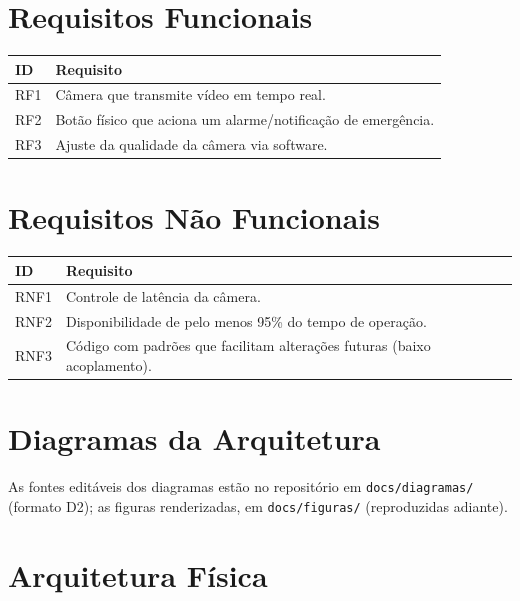 \documentclass[12pt,a4paper]{article}
\begin{document}
\section{Requisitos Funcionais}

\begin{tabularx}{\textwidth}{l X}
\toprule
\textbf{ID} & \textbf{Requisito} \\
\midrule
RF1 & Câmera que transmite vídeo em tempo real. \\
RF2 & Botão físico que aciona um alarme/notificação de emergência. \\
RF3 & Ajuste da qualidade da câmera via software. \\
\bottomrule
\end{tabularx}

\section{Requisitos Não Funcionais}

\begin{tabularx}{\textwidth}{l X}
\toprule
\textbf{ID} & \textbf{Requisito} \\
\midrule
RNF1 & Controle de latência da câmera. \\
RNF2 & Disponibilidade de pelo menos 95\% do tempo de operação. \\
RNF3 & Código com padrões que facilitam alterações futuras (baixo acoplamento). \\
\bottomrule
\end{tabularx}

\section{Diagramas da Arquitetura}

As fontes editáveis dos diagramas estão no repositório em \texttt{docs/diagramas/}
(formato D2); as figuras renderizadas, em \texttt{docs/figuras/} (reproduzidas
adiante).

\section{Arquitetura Física}
\end{document}
